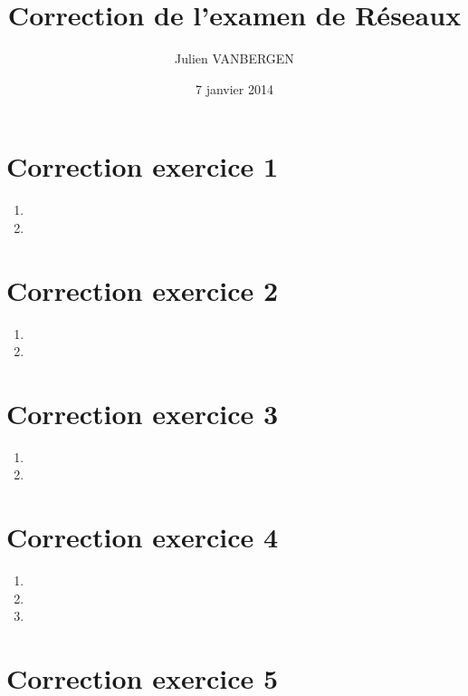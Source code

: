 \documentclass[a4paper, 11pt, titlepage]{article}
\title{Correction de l'examen de Réseaux}
\date{7 janvier 2014}
\author{Julien VANBERGEN}
\begin{document}
\maketitle

\section{Correction exercice 1}
\begin{enumerate}[label=(\alph*)]
\item

\item 


\end{enumerate}

\section{Correction exercice 2}
\begin{enumerate}[label=(\alph*)]
\item

\item 


\end{enumerate}

\section{Correction exercice 3}
\begin{enumerate}[label=(\alph*)]
\item

\item 


\end{enumerate}

\section{Correction exercice 4}
\begin{enumerate}[label=(\alph*)]
\item

\item 

\item 

\end{enumerate}

\section{Correction exercice 5}
\end{document}
